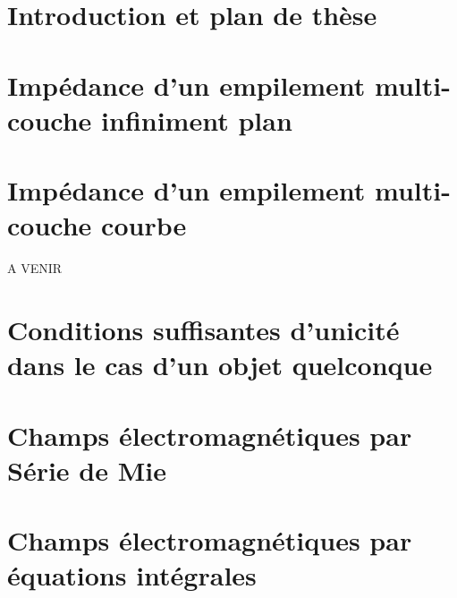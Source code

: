 \documentclass[11pt,%
draft,%
oneside,%
a4paper,%
openright %
]{book}
\author{\docauthor}
\title{\doctitle}
\begin{document}
\frontmatter
\hypersetup{pageanchor=false}
\begin{titlepage}
 \maketitle
\end{titlepage}
\hypersetup{pageanchor=true}

\setcounter{secnumdepth}{5} %
\setcounter{tocdepth}{1}  %
\dominitoc
\tableofcontents
\clearpage

\mainmatter
\chapter{Introduction et plan de thèse}


\setcounter{mtc}{2} %

\chapter{Impédance d'un empilement multi-couche infiniment plan}
\minitoc



\chapter{Impédance d'un empilement multi-couche courbe}
\minitoc
A VENIR

\chapter{Conditions suffisantes d'unicité dans le cas d'un objet quelconque}
\minitoc




\chapter{Champs électromagnétiques par Série de Mie}
\minitoc





\chapter{Champs électromagnétiques par équations intégrales}
\minitoc


\backmatter
\printbibliography
\end{document}
